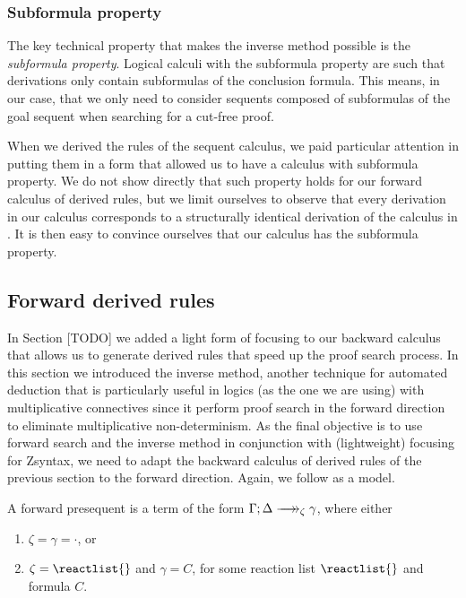 \subsubsection{Subformula property}

The key technical property that makes the inverse method possible is the
\emph{subformula property}. Logical calculi with the subformula property are
such that derivations only contain subformulas of the conclusion formula. This
means, in our case, that we only need to consider sequents composed of
subformulas of the goal sequent when searching for a cut-free proof.

When we derived the rules of the sequent calculus, we paid particular attention
in putting them in a form that allowed us to have a calculus with subformula
property. We do not show directly that such property holds for our forward
calculus of derived rules, but we limit ourselves to observe that every
derivation in our calculus corresponds to a structurally identical derivation of
the calculus in \cite{chaudhuri-thesis}. It is then easy to convince ourselves
that our calculus has the subformula property.

\subsection{Forward derived rules}

In Section [TODO] we added a light form of focusing to our backward calculus
that allows us to generate derived rules that speed up the proof search process.
In this section we introduced the inverse method, another technique for
automated deduction that is particularly useful in logics (as the one we are
using) with multiplicative connectives since it perform proof search in the
forward direction to eliminate multiplicative non-determinism. As the final
objective is to use forward search and the inverse method in conjunction with
(lightweight) focusing for Zsyntax, we need to adapt the backward calculus of
derived rules of the previous section to the forward direction. Again, we follow
\cite{chaudhuri-thesis} as a model.

\begin{definition}
  A forward presequent is a term of the form
  $\zfneuseq{\Gamma}{\Delta}{\zeta}{\gamma}$, where either

  \begin{enumerate}
  \item $\zeta = \gamma = \cdot$, or
  \item $\zeta = \reactlist{}$ and $\gamma = C$, for some reaction list
    $\reactlist{}$ and formula $C$.
  \end{enumerate}
\end{definition}

